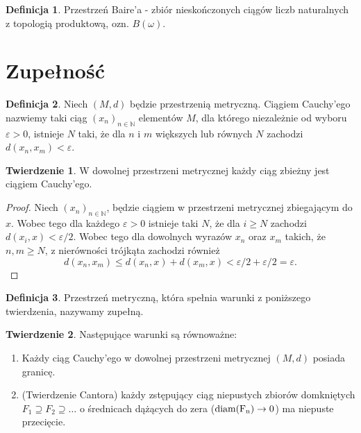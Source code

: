 \documentclass[12pt, a4paper, 2.5cm]{article}
\theoremstyle{definition}
\newtheorem{theorem}{Twierdzenie}
\newtheorem{definition}{Definicja}
\begin{document}
	\begin{definition}
		Przestrzeń Baire'a - zbiór nieskończonych ciągów liczb naturalnych z topologią produktową, ozn. $B(\omega)$.
	\end{definition}
	
	\section{Zupełność}
	
	\begin{definition}
		Niech $(M,d)$ będzie przestrzenią metryczną. Ciągiem Cauchy'ego
		nazwiemy taki ciąg $(x_n)_{n \in \mathbb{N}}$ elementów $M$, dla którego niezależnie od wyboru
		$\varepsilon>0$, istnieje $N$ taki, że dla $n$ i $m$ większych lub równych
		$N$ zachodzi $d(x_n,x_m) < \varepsilon$.
	\end{definition}
	
	\begin{theorem}
		W dowolnej przestrzeni metrycznej każdy ciąg zbieżny jest ciągiem Cauchy'ego.
	\end{theorem}
	
	\begin{proof}
		Niech $(x_n)_{n \in \mathbb{N}}$, będzie ciągiem w przestrzeni metrycznej
		zbiegającym do $x$. Wobec tego dla każdego $\varepsilon>0$ istnieje taki
		$N$, że dla $i \ge N$ zachodzi $d(x_i,x) < \varepsilon/2$. Wobec tego dla
		dowolnych wyrazów $x_n$ oraz $x_m$ takich, że $n,m \ge N$, z nierówności
		trójkąta zachodzi również
		\[
		d(x_n,x_m) \le d(x_n,x) + d(x_m,x) < \varepsilon/2 + \varepsilon/2
		= \varepsilon.
		\]
	\end{proof}
	
	\begin{definition}
		Przestrzeń metryczną, która spełnia warunki z poniższego twierdzenia, nazywamy zupełną.
	\end{definition}
	
	\begin{theorem}
		Następujące warunki są równoważne:
		\begin{enumerate}
			\item Każdy ciąg Cauchy'ego w dowolnej przestrzeni metrycznej $(M, d)$ posiada granicę.
			\item (Twierdzenie Cantora) każdy zstępujący ciąg niepustych zbiorów
			domkniętych $F_1 \supseteq F_2 \supseteq \ldots$ o średnicach dążących do zera
			($\rm diam(F_n) \to 0$) ma niepuste przecięcie.
		\end{enumerate}
	\end{theorem}
	
\end{document}
